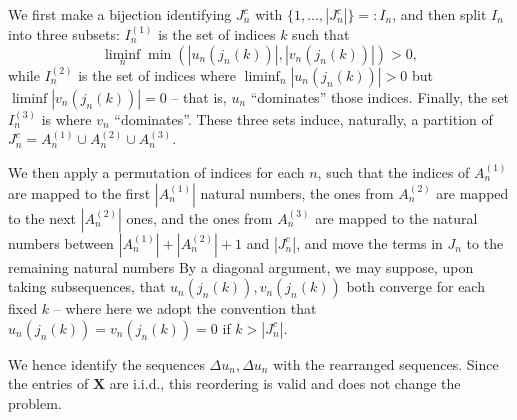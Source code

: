 \documentclass[a4paper,12pt]{amsart}
\numberwithin{equation}{section}
\newcommand{\X}{\mathbf X}
\begin{document}
We first make a bijection identifying $J_n^c$ with $\{1,\dots,|J_n^c|\} =: I_n$, and then split $I_n$ into three subsets: $I_n^{(1)}$ is the set of indices $k$ such that 
$$\liminf_n \min(|u_n(j_n(k))|,|v_n(j_n(k))|) > 0,$$
while $I_n^{(2)}$ is the set of indices where $\liminf_n |u_n(j_n(k))| > 0$ but $\liminf|v_n(j_n(k))| = 0$ -- that is, $u_n$ ``dominates'' those indices. Finally, the set $I_n^{(3)}$ is where $v_n$ ``dominates''. These three sets induce, naturally, a partition of $J_n^c = A_n^{(1)} \cup A_n^{(2)} \cup A_n^{(3)}.$

We then apply a permutation of indices for each $n$, such that the indices of $A_n^{(1)}$ are mapped to the first $|A_n^{(1)}|$ natural numbers, the ones from $A_n^{(2)}$ are mapped to the next $|A_n^{(2)}|$ ones, and the ones from $A_n^{(3)}$ are mapped to the natural numbers between $|A_n^{(1)}| + |A_n^{(2)}| + 1$ and $|J_n^c|$, and move the terms in $J_n$ to the remaining natural numbers By a diagonal argument, we may suppose, upon taking subsequences, that $u_n(j_n(k)), v_n(j_n(k))$ both converge for each fixed $k$ -- where here we adopt the convention that $u_n(j_n(k)) = v_n(j_n(k)) = 0$ if $k > |J_n^c|$. 

We hence identify the sequences $\Delta u_n, \Delta u_n$ with the rearranged sequences. Since the entries of $\X$ are i.i.d., this reordering is valid and does not change the problem. 



\end{document}
